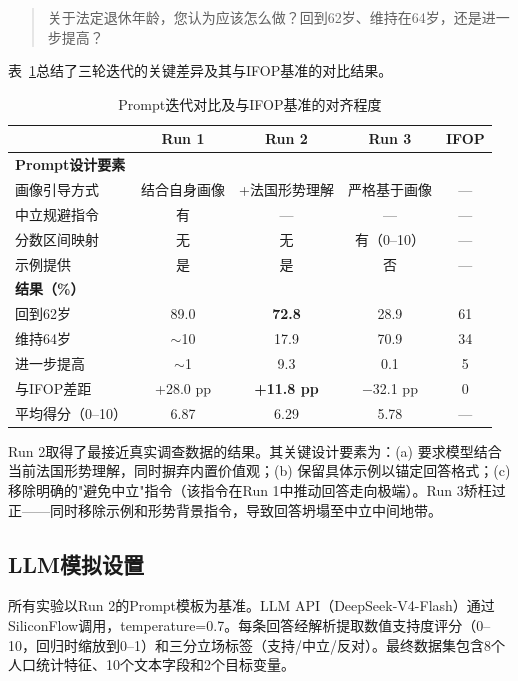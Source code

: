 \documentclass[11pt,a4paper]{ctexart}
\begin{document}
\begin{quote}
    关于法定退休年龄，您认为应该怎么做？回到62岁、维持在64岁，还是进一步提高？
\end{quote}

表~\ref{tab:prompt_iterations}总结了三轮迭代的关键差异及其与IFOP基准的对比结果。

\begin{table}[H]
    \centering
    \caption{Prompt迭代对比及与IFOP基准的对齐程度}
    \label{tab:prompt_iterations}
    \begin{tabular}{@{}lcccc@{}}
        \toprule
        & \textbf{Run 1} & \textbf{Run 2} & \textbf{Run 3} & \textbf{IFOP} \\
        \midrule
        \textbf{Prompt设计要素} & & & & \\
        \quad 画像引导方式 & 结合自身画像 & +法国形势理解 & 严格基于画像 & --- \\
        \quad 中立规避指令 & 有 & --- & --- & --- \\
        \quad 分数区间映射 & 无 & 无 & 有（0--10） & --- \\
        \quad 示例提供 & 是 & 是 & 否 & --- \\
        \midrule
        \textbf{结果（\%）} & & & & \\
        \quad 回到62岁 & 89.0 & \textbf{72.8} & 28.9 & 61 \\
        \quad 维持64岁 & $\sim$10 & 17.9 & 70.9 & 34 \\
        \quad 进一步提高 & $\sim$1 & 9.3 & 0.1 & 5 \\
        \midrule
        \quad 与IFOP差距 & +28.0 pp & \textbf{+11.8 pp} & $-$32.1 pp & 0 \\
        \quad 平均得分（0--10） & 6.87 & 6.29 & 5.78 & --- \\
        \bottomrule
    \end{tabular}
\end{table}

Run 2取得了最接近真实调查数据的结果。其关键设计要素为：(a) 要求模型结合当前法国形势理解，同时摒弃内置价值观；(b) 保留具体示例以锚定回答格式；(c) 移除明确的"避免中立"指令（该指令在Run 1中推动回答走向极端）。Run 3矫枉过正——同时移除示例和形势背景指令，导致回答坍塌至中立中间地带。

\subsection{LLM模拟设置}

所有实验以Run 2的Prompt模板为基准。LLM API（DeepSeek-V4-Flash）通过SiliconFlow调用，temperature=0.7。每条回答经解析提取数值支持度评分（0--10，回归时缩放到0--1）和三分立场标签（支持/中立/反对）。最终数据集包含8个人口统计特征、10个文本字段和2个目标变量。
\end{document}
